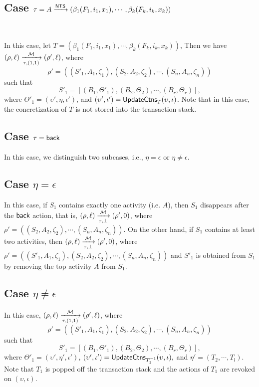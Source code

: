 {%
 

\subsection{Case $\tau = A \xrightarrow{{\sf NTS}} (\beta_1(F_1, i_1, x_1), \cdots, \beta_k(F_k, i_k, x_k))$}\ 

In this case, let $T = (\beta_1(F_1, i_1, x_1), \cdots, \beta_k(F_k, i_k, x_k))$,
Then we have $(\rho,\ell) \xrightarrow[\tau,(1,1)]{{\mathcal{M} }} (\rho',\ell)$, where
$$\rho' = ((S'_1, A_1,\zeta_1), (S_2, A_2,\zeta_2), \cdots, (S_n, A_n,\zeta_n))$$ such that 
$$S'_1 =[(B_1, \Theta'_1), (B_2, \Theta_2), \cdots, (B_r, \Theta_r)],$$ 
where $\Theta'_1 = (\upsilon', \eta, \iota')$, and $(\upsilon', \iota') = \mathsf{UpdateCtns}_{T}(\upsilon, \iota)$. Note that in this case, the concretization of $T$ is not stored into the transaction stack. 


\subsection{Case $\tau = {\mathsf{back} }$}
In this case, we distinguish two subcases, i.e., $\eta=\epsilon$ or $\eta\neq\epsilon$.
\subsection*{Case $\eta=\epsilon$}
In this case, if $S_1$ contains exactly one activity (i.e. $A$), then $S_1$ disappears after the ${\mathsf{back} }$ action, that is, $(\rho,\ell) \xrightarrow[\tau,\bot]{{\mathcal{M} }} (\rho',0)$, where $\rho' = ((S_2, A_2,\zeta_2), \cdots, (S_n, A_n,\zeta_n))$.
On the other hand, if $S_1$ contains at least two activities, then $(\rho,\ell) \xrightarrow[\tau,\bot]{{\mathcal{M} }} (\rho',0)$, where $\rho' = ((S'_1,A_1,\zeta_1), (S_2, A_2,\zeta_2), \cdots, (S_n, A_n,\zeta_n))$ and $S'_1$ is obtained from $S_1$ by removing the top activity $A$ from $S_1$.
\subsection*{Case $\eta\neq\epsilon$}
In this case, 
$(\rho,\ell) \xrightarrow[\tau,(1,1)]{{\mathcal{M} }} (\rho',\ell)$, where %
$$\rho' = ((S'_1, A_1,\zeta_1), (S_2, A_2,\zeta_2), \cdots, (S_n, A_n,\zeta_n))$$
such that 
$$S'_1 =[(B_1, \Theta'_1), (B_2, \Theta_2), \cdots, (B_r, \Theta_r)],$$ 
where 
$\Theta'_1 = (\upsilon', \eta', \iota')$, $(\upsilon', \iota') = \mathsf{UpdateCtns}_{T_1^{-1}}(\upsilon, \iota),$ and $\eta' = (T_2, \cdots, T_l)$.
Note that $T_1$ is popped off the transaction stack and the actions of $T_1$ are revoked on $(\upsilon, \iota)$.
 

}
